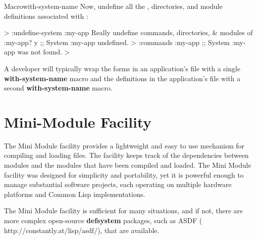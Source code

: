 \documentclass[10pt,twoside,english,pdftex]{article}
\begin{document}
\begin{functiondoc}{Macro}{with-system-name}{%
    \code{(}\code{)} \superstar{}
    \returns{} \superstar}
Now, undefine all the , directories, and module definitions
associated with  : 
%
\W\supp
\begin{example}
  > :undefine-system :my-app
  Really undefine commands, directories, & modules of :my-app?  y
  ;; System :my-app undefined.
  > :commands :my-app
  ;; System :my-app was not found.
  >
\end{example}

\fnnotes A developer will typically wrap the
\textbf{} forms in an application's
 file with a single \textbf{with-system-name} macro and
the definitions in the application's  file with a second
\textbf{with-system-name} macro.

\end{functiondoc}


\T\markright{}%
\T\pagestyle{plain}
\T\cleardoublepage
\W{}
\T\pagestyle{fancy}
\T\thispagestyle{fancybottom}
\T\global\def\fnlastname{ }%
\T\renewcommand{\headrulewidth}{0pt}
\section{Mini-Module Facility}
\label{sec:mini-module}%

%
%
%
%
%
%
%
%
%
%
The Mini Module facility provides a lightweight and easy to use mechanism for
compiling and loading  files.  The facility keeps track of the
dependencies between modules and the modules that have been compiled and
loaded. The Mini Module facility was designed for simplicity and portability,
yet it is powerful enough to manage substantial software projects, each
operating on multiple hardware platforms and Common Lisp implementations.

The Mini Module facility is sufficient for many situations, and if not,
there are more complex open-source \textbf{defsystem} packages, such as ASDF
(%
{http://constantly.at/lisp/asdf/}), that are available.
\end{document}
